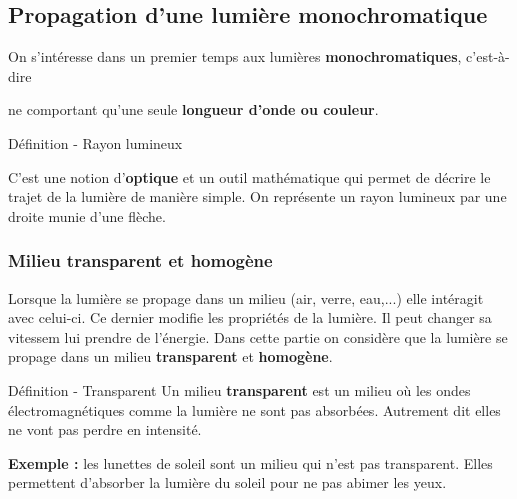 \documentclass[french, a4paper, 12pt]{article}
\begin{document}
\subsection{Propagation d'une lumière monochromatique}

On s'intéresse dans un premier temps aux lumières \textbf{monochromatiques}, c'est-à-dire\medskip

ne comportant qu'une seule \textbf{longueur d'onde ou couleur}.%

\begin{definition}{Définition - Rayon lumineux}

C'est une notion d'\textbf{optique} et un outil mathématique qui permet de décrire le trajet de la lumière de manière simple. On représente un rayon lumineux par une droite munie d'une flèche. 


\end{definition}
\subsubsection{Milieu transparent et homogène}

Lorsque la lumière se propage dans un milieu (air, verre, eau,...) elle intéragit avec celui-ci. Ce dernier modifie les propriétés de la lumière. Il peut changer sa vitessem lui prendre de l'énergie. Dans cette partie on considère que la lumière se propage dans un milieu \textbf{transparent} et \textbf{homogène}. 
\begin{definition}{Définition - Transparent}
Un milieu \textbf{transparent} est un milieu où les ondes électromagnétiques comme la lumière ne sont pas absorbées. Autrement dit elles ne vont pas perdre en intensité.

	
	
\end{definition}

\textbf{Exemple : } les lunettes de soleil sont un milieu qui n'est pas transparent. Elles permettent d'absorber la lumière du soleil pour ne pas abimer les yeux.
\end{document}
